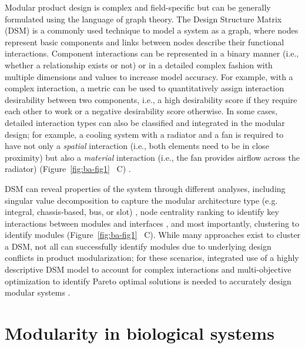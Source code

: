 Modular product design is complex and field-specific but can be generally formulated using the language of graph theory.
The Design Structure Matrix (DSM) \citep{browning2016} is a commonly used technique to model a system as a graph, where nodes represent basic components and links between nodes describe their functional interactions.
Component interactions can be represented in a binary manner (i.e., whether a relationship exists or not) or in a detailed complex fashion with multiple dimensions and values to increase model accuracy.
For example, with a complex interaction, a metric can be used to quantitatively assign interaction desirability between two components, i.e., a high desirability score if they require each other to work or a negative desirability score otherwise.
In some cases, detailed interaction types can also be classified and integrated in the modular design; for example, a cooling system with a radiator and a fan is required to have not only a \emph{spatial} interaction (i.e., both elements need to be in close proximity) but also a \emph{material} interaction (i.e., the fan provides airflow across the radiator) (Figure~\ref{fig:ba-fig1}~ C) \citep{helmer2010}.

DSM can reveal properties of the system through different analyses, including singular value decomposition to capture the modular architecture type (e.g.
integral, chassis-based, bus, or slot) \citep{RN26}, node centrality ranking to identify key interactions between modules and interfaces \citep{sosa2007}, and most importantly, clustering to identify modules (Figure~\ref{fig:ba-fig1}~ C).
While many approaches exist to cluster a DSM, not all can successfully identify modules due to underlying design conflicts in product modularization; for these scenarios, integrated use of a highly descriptive DSM model to account for complex interactions and multi-objective optimization to identify Pareto optimal solutions is needed to accurately design modular systems \citep{helmer2010}.

\section{Modularity in biological systems}

